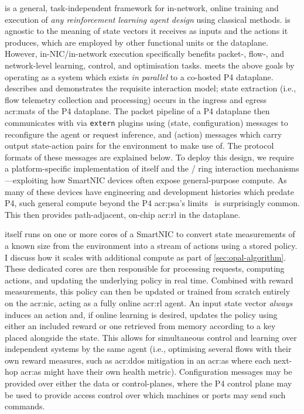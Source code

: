 \approachshort{} is a general, task-independent framework for in-network, online training and execution of \emph{any reinforcement learning agent design} using classical methods.
\approachshort{} is agnostic to the meaning of state vectors it receives as inputs and the actions it produces, which are employed by other functional units or the dataplane.
However, in-NIC/in-network execution specifically benefits packet-, flow-, and network-level learning, control, and optimisation tasks.
\approachshort{} meets the above goals by operating as a system which exists \emph{in parallel} to a co-hosted P4 dataplane.
 describes and demonstrates the requisite interaction model; state extraction (i.e., flow telemetry collection and processing) occurs in the ingress and egress \glspl{acr:mat} of the P4 dataplane.
The packet pipeline of a P4 dataplane then communicates with \approachshort{} via \texttt{extern} plugins using \inring{} (state, configuration) messages to reconfigure the agent or request inference, and \outring{} (action) messages which carry output state-action pairs for the environment to make use of.
The protocol formats of these messages are explained below.
To deploy this design, we require a platform-specific implementation of \approachshort{} itself and the \inring{}/\outring{} ring interaction mechanisms---exploiting how SmartNIC devices often expose general-purpose compute.
As many of these devices have engineering and development histories which predate P4, such general compute beyond the P4 \gls{acr:psa}'s limits~\parencite{p4-psa} is surprisingly common.
This then provides path-adjacent, on-chip \gls{acr:rl} in the dataplane.

\approachshort{} itself runs on one or more cores of a SmartNIC to convert state measurements of a known size from the environment into a stream of actions using a stored policy.
I discuss how it scales with additional compute as part of \cref{sec:opal-algorithm}.
These dedicated cores are then responsible for processing requests, computing actions, and updating the underlying policy in real time.
Combined with reward measurements, this policy can then be updated or trained from scratch entirely on the \gls{acr:nic}, acting as a fully online \gls{acr:rl} agent.
An input state vector \emph{always} induces an action and, if online learning is desired, updates the policy using either an included reward or one retrieved from memory according to a key placed alongside the state.
This allows for simultaneous control and learning over independent systems by the same agent (i.e., optimising several flows with their own reward measures, such as \gls{acr:ddos} mitigation in an \gls{acr:as} where each next-hop \gls{acr:as} might have their own health metric).
Configuration messages may be provided over either the data or control-planes, where the P4 control plane may be used to provide access control over which machines or ports may send such commands.

